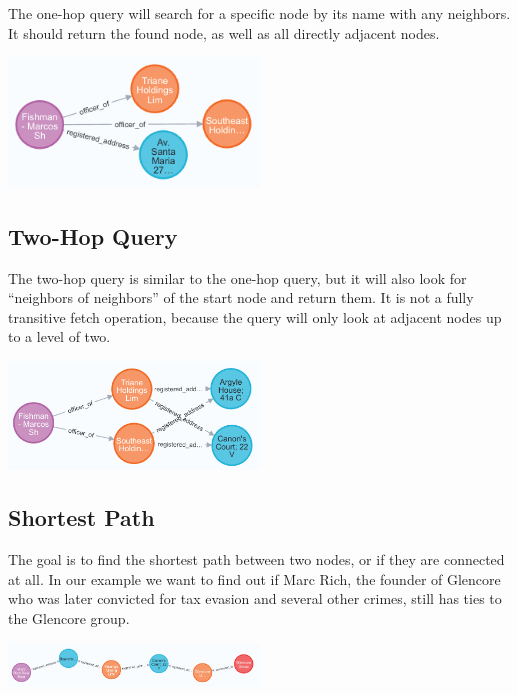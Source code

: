 \documentclass[11pt, a4paper,oneside,chapterprefix=false]{scrbook}
\begin{document}
The one-hop query will search for a specific node by its name with any neighbors. It should return the found node, as well as all directly adjacent nodes.

\begin{center}
\includegraphics*[width=0.5\textwidth]{figures/query-one-hop.png}
\end{center}



\subsection{Two-Hop Query}

The two-hop query is similar to the one-hop query, but it will also look for ``neighbors of neighbors'' of the start node and return them. It is not a fully transitive fetch operation, because the query will only look at adjacent nodes up to a level of two.

\begin{center}
\includegraphics*[width=0.5\textwidth]{figures/query-two-hop.png}
\end{center}

\subsection{Shortest Path}

The goal is to find the shortest path between two nodes, or if they are connected at all. In our example we want to find out if Marc Rich, the founder of Glencore who was later convicted for tax evasion and several other crimes, still has ties to the Glencore group.

\begin{center}

\includegraphics*[width=0.5\textwidth]{figures/query-shortest-path-2.png}
\end{center}
\end{document}
